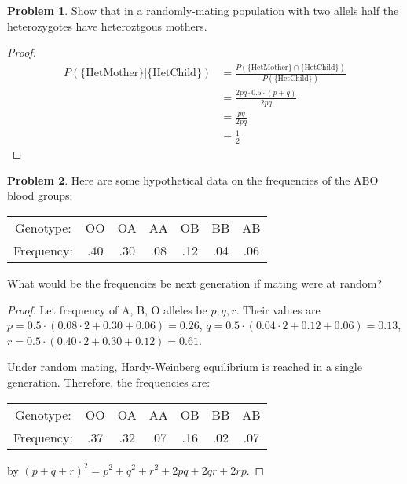 \documentclass[12pt]{report}
\theoremstyle{definition}
\newtheorem{problem}{Problem}[chapter]
\begin{document}
        \begin{problem}
            Show that in a randomly-mating population with two allels half the heterozygotes have heteroztgous mothers.
            \begin{proof}
                \begin{equation*}
                    \begin{split}
                        P(\mathrm{\{Het Mother\}|\{Het Child\}}) &= 
                        \frac{P(\mathrm{\{Het Mother\} \cap \{Het Child\}})}{P(\mathrm{\{Het Child\}})}\\
                        &= \frac{2pq \cdot 0.5 \cdot (p+q)}{2pq}  \\
                        &= \frac{pq}{2pq} \\ 
                        &= \frac{1}{2}
                    \end{split}
                \end{equation*}
            \end{proof}
        \end{problem}

        \begin{problem}
            Here are some hypothetical data on the frequencies of the ABO blood groups:
            \begin{center}
                \begin{tabular}{ccccccc}
                    \hline
                    Genotype: & OO & OA & AA & OB & BB & AB \\
                    Frequency: & .40 & .30 & .08 & .12 & .04 & .06\\
                    \hline
                \end{tabular}
            \end{center}
            What would be the frequencies be next generation if mating were at random?
            \begin{proof}
                Let frequency of A, B, O alleles be $p,q,r$.
                Their values are 
                $p = 0.5 \cdot (0.08 \cdot 2 + 0.30 + 0.06) = 0.26$,
                $q = 0.5 \cdot (0.04 \cdot 2 + 0.12 + 0.06) = 0.13$,
                $r = 0.5 \cdot (0.40 \cdot 2 + 0.30 + 0.12) = 0.61$.

                Under random mating, Hardy-Weinberg equilibrium is reached in a single generation.
                Therefore, the frequencies are:
                \begin{center}
                    \begin{tabular}{ccccccc}
                        \hline
                        Genotype: & OO & OA & AA & OB & BB & AB \\
                        Frequency: & .37 & .32 & .07 & .16 & .02 & .07\\
                        \hline
                    \end{tabular}
                \end{center}
                by $(p+q+r)^2 = p^2 + q^2 + r^2 + 2pq + 2qr + 2rp$.
            \end{proof}
        \end{problem}
\end{document}
